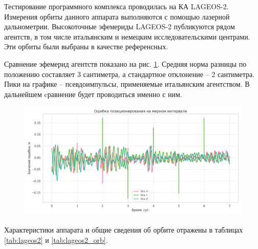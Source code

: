 Тестирование программного комплекса проводилась на КА LAGEOS-2.
Измерения орбиты данного аппарата выполняются с помощью лазерной дальнометрии.
Высокоточные эфемериды LAGEOS-2 публикуются рядом агентств, 
в том числе итальянским и немецким исследовательскими центрами. Эти орбиты
были выбраны в качестве референсных. 

Сравнение эфемерид агентств показано на рис. \ref{fig:compare_agencies}. Средняя
норма разницы по положению составляет 3 сантиметра, а стандартное отклонение -- 2 сантиметра. 
Пики на графике -- псевдоимпульсы, применяемые итальянским агентством. В дальнейшем cравнение
будет проводиться именно с ним.

\begin{figure}[h!]
    \centering
    \includegraphics[width=\linewidth]{../images/solution/lageos/compare_agencies.png}
    \label{fig:compare_agencies}
 \end{figure}

Характеристики аппарата и общие сведения об орбите отражены в таблицах \ref{tab:lageos2}
и \ref{tab:lageos2_orb}.

